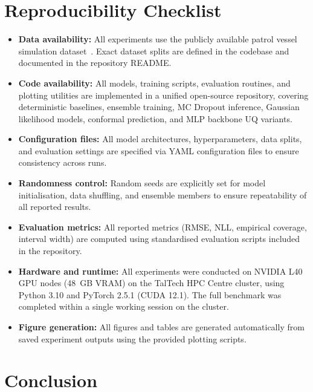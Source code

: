 \documentclass[a4paper,fleqn]{cas-sc}
\begin{document}
\section{Reproducibility Checklist}

\begin{itemize}
    \item \textbf{Data availability:} All experiments use the publicly available patrol vessel simulation dataset~\cite{baier2022darus}. Exact dataset splits are defined in the codebase and documented in the repository README.

    \item \textbf{Code availability:} All models, training scripts, evaluation routines, and plotting utilities are implemented in a unified open-source repository, covering deterministic baselines, ensemble training, MC Dropout inference, Gaussian likelihood models, conformal prediction, and MLP backbone UQ variants.

    \item \textbf{Configuration files:} All model architectures, hyperparameters, data splits, and evaluation settings are specified via YAML configuration files to ensure consistency across runs.

    \item \textbf{Randomness control:} Random seeds are explicitly set for model initialisation, data shuffling, and ensemble members to ensure repeatability of all reported results.

    \item \textbf{Evaluation metrics:} All reported metrics (RMSE, NLL, empirical coverage, interval width) are computed using standardised evaluation scripts included in the repository.

    \item \textbf{Hardware and runtime:} All experiments were conducted on NVIDIA L40 GPU nodes (48~GB VRAM) on the TalTech HPC Centre cluster, using Python 3.10 and PyTorch 2.5.1 (CUDA 12.1). The full benchmark was completed within a single working session on the cluster.

    \item \textbf{Figure generation:} All figures and tables are generated automatically from saved experiment outputs using the provided plotting scripts.
\end{itemize}
\section{Conclusion}
\end{document}
